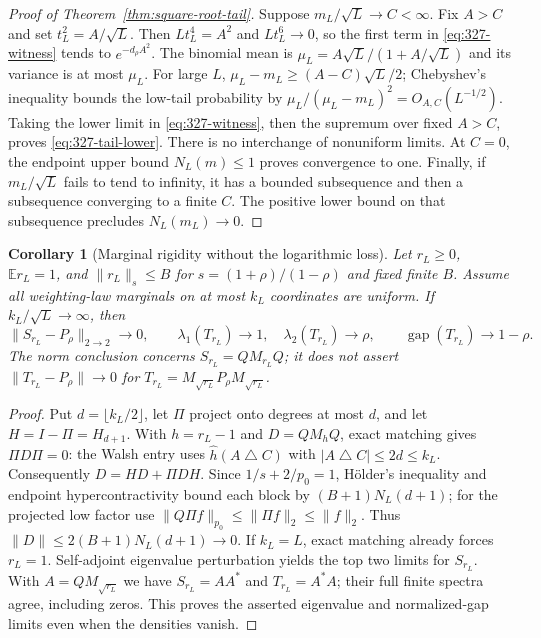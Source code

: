 \documentclass[11pt]{article}
\newtheorem{corollary}[theorem]{Corollary}
\newcommand{\gap}{\operatorname{gap}}
\begin{document}
\begin{proof}[Proof of Theorem~\ref{thm:square-root-tail}]
Suppose $m_L/\sqrt L\to C<\infty$. Fix $A>C$ and set
$t_L^2=A/\sqrt L$. Then $Lt_L^4=A^2$ and $Lt_L^6\to0$, so the
first term in \eqref{eq:327-witness} tends to $e^{-d_\rho A^2}$.
The binomial mean is $\mu_L=A\sqrt L/(1+A/\sqrt L)$ and its
variance is at most $\mu_L$. For large $L$,
$\mu_L-m_L\geq(A-C)\sqrt L/2$; Chebyshev's inequality bounds
the low-tail probability by $\mu_L/(\mu_L-m_L)^2=O_{A,C}(L^{-1/2})$.
Taking the lower limit in \eqref{eq:327-witness}, then the supremum over
fixed $A>C$, proves \eqref{eq:327-tail-lower}. There is no interchange
of nonuniform limits. At $C=0$, the endpoint upper bound $N_L(m)\leq1$
proves convergence to one.
Finally, if $m_L/\sqrt L$ fails to tend to infinity, it has a bounded
subsequence and then a subsequence converging to a finite $C$.
The positive lower bound on that subsequence precludes $N_L(m_L)\to0$.
\end{proof}

\begin{corollary}[Marginal rigidity without the logarithmic loss]
\label{cor:327-marginals}
Let $r_L\geq0$, $\mathbb E r_L=1$, and
$\|r_L\|_s\leq B$ for $s=(1+\rho)/(1-\rho)$ and fixed finite $B$.
Assume all weighting-law marginals on at most $k_L$ coordinates are
uniform. If $k_L/\sqrt L\to\infty$, then
\[
 \|S_{r_L}-P_\rho\|_{2\to2}\to0,\qquad
 \lambda_1(T_{r_L})\to1,\quad\lambda_2(T_{r_L})\to\rho,
 \qquad \gap(T_{r_L})\to1-\rho.
\]
The norm conclusion concerns $S_{r_L}=QM_{r_L}Q$; it does not assert
$\|T_{r_L}-P_\rho\|\to0$ for $T_{r_L}=M_{\sqrt{r_L}}P_\rho M_{\sqrt{r_L}}$.
\end{corollary}
\begin{proof}
Put $d=\lfloor k_L/2\rfloor$, let $\Pi$ project onto degrees at most
$d$, and let $H=I-\Pi=H_{d+1}$. With $h=r_L-1$ and $D=QM_hQ$,
exact matching gives $\Pi D\Pi=0$: the Walsh entry uses
$\widehat h(A\mathbin\triangle C)$ with $|A\mathbin\triangle C|\leq2d\leq k_L$.
Consequently $D=HD+\Pi DH$. Since $1/s+2/p_0=1$,
H\"older's inequality and endpoint hypercontractivity bound each block
by $(B+1)N_L(d+1)$; for the projected low factor use
$\|Q\Pi f\|_{p_0}\leq\|\Pi f\|_2\leq\|f\|_2$.
Thus $\|D\|\leq2(B+1)N_L(d+1)\to0$. If $k_L=L$, exact matching
already forces $r_L=1$. Self-adjoint eigenvalue perturbation yields the
top two limits for $S_{r_L}$. With $A=QM_{\sqrt{r_L}}$ we have
$S_{r_L}=AA^*$ and $T_{r_L}=A^*A$; their full finite spectra agree,
including zeros. This proves the asserted eigenvalue and normalized-gap
limits even when the densities vanish.
\end{proof}
\end{document}
